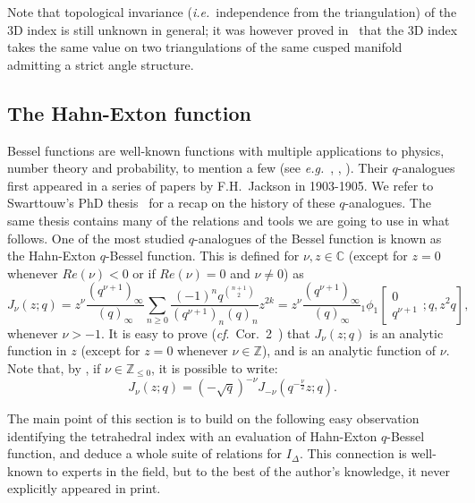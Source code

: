 \documentclass[11pt]{amsart}
\newcommand{\Z}{\mathbb{Z}}
\newcommand{\C}{\mathbb{C}}
\newcommand{\tet}{I_{\Delta}}
\begin{document}
Note that topological invariance (\emph{i.e.}~independence from the triangulation) of the $3$D index is still unknown in general; it was however proved in~\cite{garoufalidis2019meromorphic}  that the $3$D index takes the same value on two triangulations of the same cusped manifold admitting a strict angle structure.



\subsection{The Hahn-Exton function}\label{ssec:hahnexton}

Bessel functions are well-known functions with multiple applications to physics, number theory and probability, to mention a few (see \textit{e.g.}~\cite{koelink1995q}, \cite{koelink1994quantum}, \cite{swarttouw1992addition}). Their $q$-analogues first appeared in a series of papers by F.H.~Jackson in 1903-1905.  We refer to Swarttouw's PhD thesis~\cite{SwarttouwPhD} for a recap on the history of these $q$-analogues. The same thesis contains many of the relations and tools we are going to use in what follows.
One of the most studied $q$-analogues of the Bessel function is known as the Hahn-Exton  $q$-Bessel function. This is defined for $\nu, z \in \C$ (except for $z =0$ whenever $Re\left(\nu\right)<0$ or if $Re\left(\nu\right) = 0$ and $\nu \neq 0$) as
\begin{equation}\label{eqn:def_J}
J_\nu \left(z;q\right) = z^\nu \frac{\left(q^{\nu +1}\right)_\infty}{\left(q\right)_\infty} \sum_{n\ge 0} \frac{\left(-1\right)^n q^{\binom{n+1}{2}}}{\left(q^{\nu+1}\right)_n \left(q\right)_n} z^{2k} = z^\nu \frac{\left(q^{\nu +1}\right)_\infty}{\left(q\right)_\infty} {_1 \phi_1}\left[\begin{matrix} 0  \\ q^{\nu+1}  \end{matrix} ; q,z^2 q \right],
\end{equation}
whenever $\nu >-1$. It is easy to prove (\emph{cf}.~Cor.~2~\cite{SwarttouwPhD}) that $J_\nu\left(z;q\right)$ is an analytic function in $z$ (except for $z=0$ whenever $\nu \in \Z$), and is an analytic function of $\nu$.\\


Note that, by \cite[Thm.~3.2]{SwarttouwPhD}, if $\nu \in \Z_{\le 0}$, it is possible to write:
$$J_{\nu}\left(z;q\right) = \left(-\sqrt{q}\right)^{-\nu} J_{-\nu}\left(q^{-\frac{\nu}{2}} z;q\right).$$

The main point of this section is to build on the following easy observation identifying the tetrahedral index with an evaluation of Hahn-Exton $q$-Bessel function, and deduce a whole suite of relations for $\tet$. This connection is well-known to experts in the field, but to the best of the author's knowledge, it never explicitly appeared in print.
\end{document}
